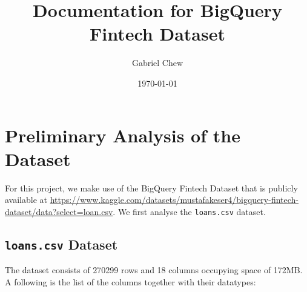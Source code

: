 \documentclass[a4paper, 10pt]{article}
\title{Documentation for BigQuery Fintech Dataset}
\author{Gabriel Chew}
\date{\today}
\begin{document}
 
\maketitle
\section{Preliminary Analysis of the Dataset}
For this project, we make use of the BigQuery Fintech Dataset that is publicly available at  \href{https://www.kaggle.com/datasets/mustafakeser4/bigquery-fintech-dataset/data?select=loan.csv}{https://www.kaggle.com/datasets/mustafakeser4/bigquery-fintech-dataset/data?select=loan.csv}. We first analyse the \texttt{loans.csv} dataset. 

\subsection{\texttt{loans.csv} Dataset}
The dataset consists of 270299 rows and 18 columns occupying space of 172MB. A following is the list of the columns together with their datatypes:
\end{document}
